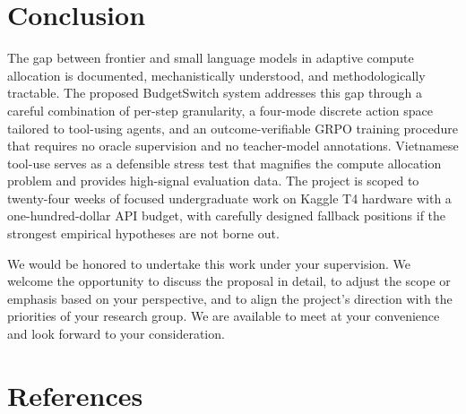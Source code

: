 \documentclass[11pt,a4paper]{article}
\begin{document}
\section{Conclusion}

The gap between frontier and small language models in adaptive compute allocation is documented, mechanistically understood, and methodologically tractable. The proposed BudgetSwitch system addresses this gap through a careful combination of per-step granularity, a four-mode discrete action space tailored to tool-using agents, and an outcome-verifiable GRPO training procedure that requires no oracle supervision and no teacher-model annotations. Vietnamese tool-use serves as a defensible stress test that magnifies the compute allocation problem and provides high-signal evaluation data. The project is scoped to twenty-four weeks of focused undergraduate work on Kaggle T4 hardware with a one-hundred-dollar API budget, with carefully designed fallback positions if the strongest empirical hypotheses are not borne out.

We would be honored to undertake this work under your supervision. We welcome the opportunity to discuss the proposal in detail, to adjust the scope or emphasis based on your perspective, and to align the project's direction with the priorities of your research group. We are available to meet at your convenience and look forward to your consideration.

\section*{References}
\end{document}

